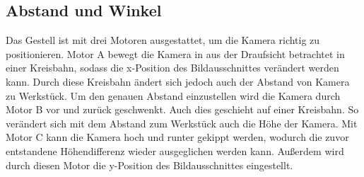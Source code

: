 \documentclass[12pt,a4paper,bibliography=totocnumbered,listof=totocnumbered]{scrartcl}
\begin{document}
\subsection{Abstand und Winkel}
\label{abstandWinkel}
Das Gestell ist mit drei Motoren ausgestattet, um die Kamera richtig zu positionieren. Motor A bewegt die Kamera in aus der Draufsicht betrachtet in einer Kreisbahn, sodass die x-Position des Bildausschnittes verändert werden kann. Durch diese Kreisbahn ändert sich jedoch auch der Abstand von Kamera zu Werkstück. Um den genauen Abstand einzustellen wird die Kamera durch Motor B vor und zurück geschwenkt. Auch dies geschieht auf einer Kreisbahn. So verändert sich mit dem Abstand zum Werkstück auch die Höhe der Kamera. Mit Motor C kann die Kamera hoch und runter gekippt werden, wodurch die zuvor entstandene Höhendifferenz wieder ausgeglichen werden kann. Außerdem wird durch diesen Motor die y-Position des Bildausschnittes eingestellt.
\end{document}
